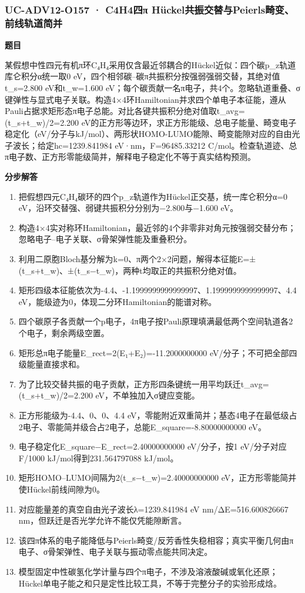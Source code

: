 \documentclass[UTF8,11pt,a4paper]{ctexart}
\begin{document}
\subsubsection*{UC-ADV12-O157 · C4H4四π Hückel共振交替与Peierls畸变、前线轨道简并}
\noindent\textbf{题目}\par
某假想中性四元有机π环C₄H₄采用仅含最近邻耦合的Hückel近似：四个碳p\_z轨道库仑积分α统一取0 eV，四个相邻碳–碳π共振积分按强弱强弱交替，其绝对值t\_s=2.800 eV和t\_w=1.600 eV；每个碳贡献一名π电子，共4个。忽略轨道重叠、σ键弹性与显式电子关联。构造4×4环Hamiltonian并求四个单电子本征能，遵从Pauli占据求矩形态π电子总能。对比各键共振积分绝对值取t\_avg=(t\_s+t\_w)/2=2.200 eV的正方形等边环，求正方形能级、总电子能量、畸变电子稳定化（eV/分子与kJ/mol）、两形状HOMO-LUMO能隙、畸变能隙对应的自由光子波长；给定hc=1239.841984 eV·nm，F=96485.33212 C/mol。检查轨道迹、总π电子数、正方形零能级简并，解释电子稳定化不等于真实结构预测。\par
\medskip\noindent\textbf{分步解答}
\begin{enumerate}
\item 把假想四元C₄H₄碳环的四个p\_z轨道作为Hückel正交基，统一库仑积分α=0 eV，沿环交替强、弱键共振积分分别为−2.800与−1.600 eV。
\item 构造4×4实对称环Hamiltonian，最近邻的4个非零非对角元按强弱交替分布；忽略电子–电子关联、σ骨架弹性能及重叠积分。
\item 利用二原胞Bloch基分解为k=0、π两个2×2问题，解得本征能E=±(t\_s+t\_w)、±(t\_s−t\_w)，两种t均取正的共振积分绝对值。
\item 矩形四级本征能依次为-4.4、-1.1999999999999997、1.1999999999999997、4.4 eV，能级迹为0，体现二分环Hamiltonian的能谱对称。
\item 四个碳原子各贡献一个p电子，4π电子按Pauli原理填满最低两个空间轨道各2个电子，剩余两级空置。
\item 矩形总π电子能量E\_rect=2(E₁+E₂)=-11.2000000000 eV/分子；不可把全部四级能量直接求和。
\item 为了比较交替共振的电子贡献，正方形四条键统一用平均跃迁t\_avg=(t\_s+t\_w)/2=2.200 eV，不单独加入σ键应变能。
\item 正方形能级为-4.4、0、0、4.4 eV，零能附近双重简并；基态4电子在最低级占2电子、零能简并级合占2电子，总能E\_square=-8.80000000000 eV。
\item 电子稳定化E\_square−E\_rect=2.40000000000 eV/分子，按1 eV/分子对应F/1000 kJ/mol得到231.564797088 kJ/mol。
\item 矩形HOMO–LUMO间隔为2(t\_s−t\_w)=2.40000000000 eV，正方形零能简并使Hückel前线间隙为0。
\item 对应能量差的真空自由光子波长λ=1239.841984 eV nm/ΔE=516.600826667 nm，但跃迁是否光学允许不能仅凭能隙断言。
\item 该四π体系的电子能降低与Peierls畸变/反芳香性失稳相容；真实平衡几何由π电子、σ骨架弹性、电子关联与振动零点能共同决定。
\item 模型固定中性碳氢化学计量与四个π电子，不涉及溶液酸碱或氧化还原；Hückel单电子能之和只是定性比较工具，不等于完整分子的实验形成焓。
\end{enumerate}
\end{document}
